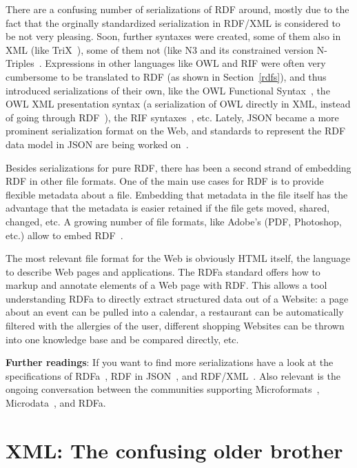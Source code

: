 There are a confusing number of serializations of RDF around, mostly due to the fact that the orginally standardized serialization in RDF/XML is considered to be not very pleasing.
Soon, further syntaxes were created, some of them also in XML (like TriX~\cite{trix}), some of them not (like N3 and its constrained version N-Triples~\cite{ntriples}.
Expressions in other languages like OWL and RIF were often very cumbersome to be translated to RDF (as shown in Section~\ref{rdfs}), and thus introduced serializations of their own, like the OWL Functional Syntax~\cite{owl2}, the OWL XML presentation syntax (a serialization of OWL directly in XML, instead of going through RDF~\cite{owl3}), the RIF syntaxes~\cite{rif}, etc.
Lately, JSON became a more prominent serialization format on the Web, and standards to represent the RDF data model in JSON are being worked on~\cite{json-ld}.

Besides serializations for pure RDF, there has been a second strand of embedding RDF in other file formats.
One of the main use cases for RDF is to provide flexible metadata about a file.
Embedding that metadata in the file itself has the advantage that the metadata is easier retained if the file gets moved, shared, changed, etc.
A growing number of file formats, like Adobe's (PDF, Photoshop, etc.) allow to embed RDF~\cite{xmp}.

The most relevant file format for the Web is obviously HTML itself, the language to describe Web pages and applications.
The RDFa standard offers how to markup and annotate elements of a Web page with RDF.
This allows a tool understanding RDFa to directly extract structured data out of a Website:
a page about an event can be pulled into a calendar,
a restaurant can be automatically filtered with the allergies of the user,
different shopping Websites can be thrown into one knowledge base and be compared directly, etc.

\medskip

\textbf{Further readings}:
If you want to find more serializations have a look at the specifications of RDFa~\cite{rdfa}, RDF in JSON~\cite{json-ld}, and RDF/XML~\cite{rdfxml}.
Also relevant is the ongoing conversation between the communities supporting Microformats~\cite{microformats}, Microdata~\cite{microdata}, and RDFa.

\section{XML: The confusing older brother}
\label{xml}


